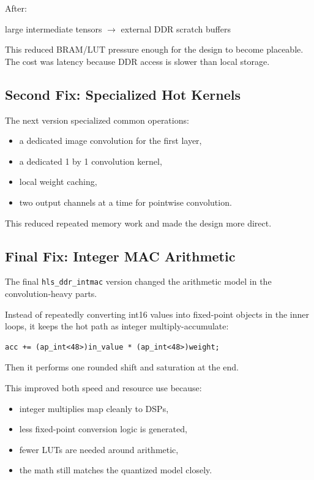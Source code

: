 \documentclass[11pt]{article}
\newcommand{\code}[1]{\texttt{#1}}
\begin{document}
After:

\begin{center}
large intermediate tensors \(\rightarrow\) external DDR scratch buffers
\end{center}

This reduced BRAM/LUT pressure enough for the design to become placeable.
The cost was latency because DDR access is slower than local storage.

\subsection{Second Fix: Specialized Hot Kernels}

The next version specialized common operations:

\begin{itemize}[leftmargin=1.4em]
  \item a dedicated image convolution for the first layer,
  \item a dedicated 1 by 1 convolution kernel,
  \item local weight caching,
  \item two output channels at a time for pointwise convolution.
\end{itemize}

This reduced repeated memory work and made the design more direct.

\subsection{Final Fix: Integer MAC Arithmetic}

The final \code{hls\_ddr\_intmac} version changed the arithmetic model in the convolution-heavy parts.

Instead of repeatedly converting int16 values into fixed-point objects in the inner loops, it keeps the hot path as integer multiply-accumulate:

\begin{lstlisting}
acc += (ap_int<48>)in_value * (ap_int<48>)weight;
\end{lstlisting}

Then it performs one rounded shift and saturation at the end.

This improved both speed and resource use because:

\begin{itemize}[leftmargin=1.4em]
  \item integer multiplies map cleanly to DSPs,
  \item less fixed-point conversion logic is generated,
  \item fewer LUTs are needed around arithmetic,
  \item the math still matches the quantized model closely.
\end{itemize}
\end{document}
